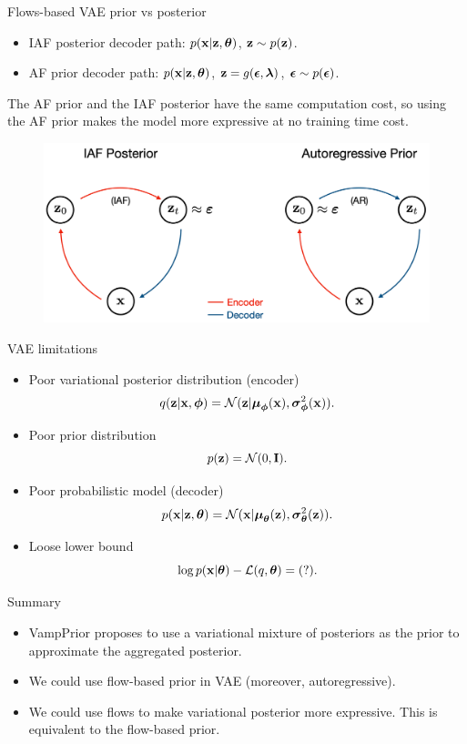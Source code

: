 \begin{frame}{Flows-based VAE prior vs posterior}
	\begin{itemize}
		\item IAF posterior decoder path: $p(\mathbf{x}|\mathbf{z}, \boldsymbol{\theta})$, $\mathbf{z} \sim p(\mathbf{z})$.
		\item AF prior decoder path: $p(\mathbf{x}|\mathbf{z}, \boldsymbol{\theta})$, $\mathbf{z} = g(\boldsymbol{\epsilon}, \boldsymbol{\lambda})$, $\boldsymbol{\epsilon} \sim p(\boldsymbol{\epsilon})$. 
	\end{itemize}
	The AF prior and the IAF posterior have the same computation cost, so using the AF prior makes the model more expressive at no training time cost.

	\begin{figure}
		\includegraphics[width=0.85\linewidth]{figs/prior_vs_posterior}
	\end{figure}

\end{frame}
\begin{frame}{VAE limitations}
	\begin{itemize}
		\item Poor variational posterior distribution (encoder)
		\[
			q(\mathbf{z} | \mathbf{x}, \boldsymbol{\phi}) = \mathcal{N}(\mathbf{z}| \boldsymbol{\mu}_{\boldsymbol{\phi}}(\mathbf{x}), \boldsymbol{\sigma}^2_{\boldsymbol{\phi}}(\mathbf{x})).
		\]
		\item Poor prior distribution
		\[
			p(\mathbf{z}) = \mathcal{N}(0, \mathbf{I}).
		\]
		\item Poor probabilistic model (decoder)
		\[
			p(\mathbf{x} | \mathbf{z}, \boldsymbol{\theta}) = \mathcal{N}(\mathbf{x}| \boldsymbol{\mu}_{\boldsymbol{\theta}}(\mathbf{z}), \boldsymbol{\sigma}^2_{\boldsymbol{\theta}}(\mathbf{z})).
		\]
		\item Loose lower bound
		\[
			\log p(\mathbf{x} | \boldsymbol{\theta}) - \mathcal{L}(q, \boldsymbol{\theta}) = (?).
		\]
	\end{itemize}
\end{frame}
\begin{frame}{Summary}
	\begin{itemize}
		\item VampPrior proposes to use a variational mixture of posteriors as the prior to approximate the aggregated posterior.
		\vfill
		\item We could use flow-based prior in VAE (moreover, autoregressive).
		\vfill
		\item We could use flows to make variational posterior more expressive. This is equivalent to the flow-based prior. 
	\end{itemize}
\end{frame}

 
